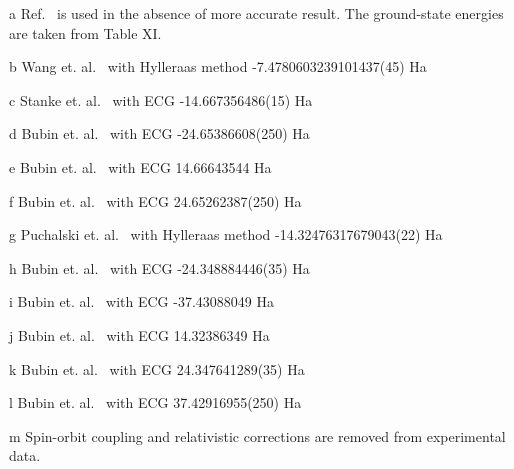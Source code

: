 \begin{table*}[t!]
\begin{threeparttable}
\begin{tablenotes}
\item[a] Ref.~\cite{Davidson_Atoms} is used in the absence of more accurate result. The ground-state energies are taken from Table XI.
\item[b] Wang et. al.~\cite{Wang_Li} with Hylleraas method -7.4780603239101437(45) Ha
\item[c] Stanke et. al.~\cite{Stanke_Be} with ECG -14.667356486(15) Ha
\item[d] Bubin et. al.~\cite{Bubin_B} with ECG -24.65386608(250) Ha
\item[e] Bubin et. al.~\cite{Bubin_BeH_noBO} with ECG \text{-}14.66643544 Ha
\item[f] Bubin et. al.~\cite{Bubin_B} with ECG \text{-}24.65262387(250) Ha
\item[g] Puchalski et. al.~\cite{Puchalski_Be+} with Hylleraas method -14.32476317679043(22) Ha
\item[h] Bubin et. al.~\cite{Bubin_B+} with ECG -24.348884446(35) Ha
\item[i] Bubin et. al.~\cite{Bubin_C+} with ECG -37.43088049 Ha
\item[j] Bubin et. al.~\cite{Bubin_BeH_noBO} with ECG \text{-}14.32386349 Ha
\item[k] Bubin et. al.~\cite{Bubin_B+} with ECG \text{-}24.347641289(35) Ha
\item[l] Bubin et. al.~\cite{Bubin_C+} with ECG \text{-}37.42916955(250) Ha
\item[m] Spin-orbit coupling and relativistic corrections are removed from experimental data.~\cite{Klopper_IP,NIST_Atoms}
\end{tablenotes}

\end{threeparttable}
\end{table*}